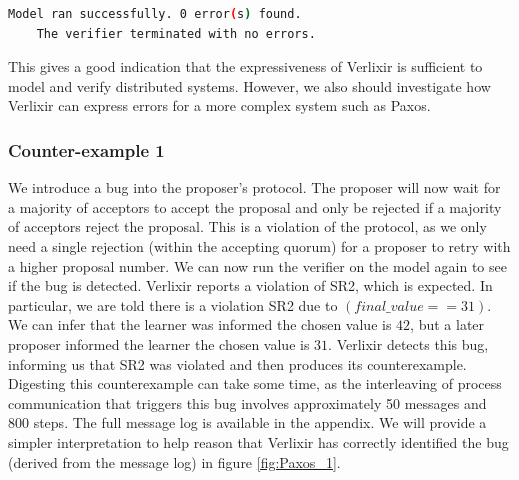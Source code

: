 \begin{lstlisting}[language=bash, xleftmargin=.3\linewidth]
    Model ran successfully. 0 error(s) found.
    The verifier terminated with no errors.
\end{lstlisting}
This gives a good indication that the expressiveness of Verlixir is sufficient to model and verify distributed systems. However, we also should investigate how Verlixir can express errors for a more complex system such as Paxos. 
\subsubsection{Counter-example 1}
We introduce a bug into the proposer's protocol. The proposer will now wait for a majority of acceptors to accept the proposal and only be rejected if a majority of acceptors reject the proposal. This is a violation of the protocol, as we only need a single rejection (within the accepting quorum) for a proposer to retry with a higher proposal number. We can now run the verifier on the model again to see if the bug is detected. Verlixir reports a violation of SR2, which is expected. In particular, we are told there is a violation SR2 due to $( final\_value == 31 )$. We can infer that the learner was informed the chosen value is $42$, but a later proposer informed the learner the chosen value is $31$. Verlixir detects this bug, informing us that SR2 was violated and then produces its counterexample. Digesting this counterexample can take some time, as the interleaving of process communication that triggers this bug involves approximately 50 messages and 800 steps. The full message log is available in the appendix. We will provide a simpler interpretation to help reason that Verlixir has correctly identified the bug (derived from the message log) in figure \ref{fig:Paxos_1}.
